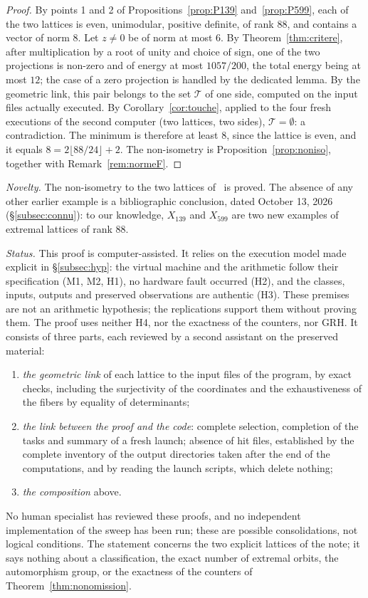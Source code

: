 \documentclass[11pt,a4paper]{amsart}
\theoremstyle{plain}
\theoremstyle{definition}
\numberwithin{equation}{section}
\newcommand{\Tc}{\mathcal{T}}
\begin{document}
\begin{proof}
By points 1 and 2 of Propositions~\ref{prop:P139} and~\ref{prop:P599}, each of the two lattices is even, unimodular, positive definite, of rank $88$, and contains a vector of norm $8$. Let $z\ne0$ be of norm at most $6$. By Theorem~\ref{thm:critere}, after multiplication by a root of unity and choice of sign, one of the two projections is non-zero and of energy at most $1057/200$, the total energy being at most $12$; the case of a zero projection is handled by the dedicated lemma. By the geometric link, this pair belongs to the set $\Tc$ of one side, computed on the input files actually executed. By Corollary~\ref{cor:touche}, applied to the four fresh executions of the second computer (two lattices, two sides), $\Tc=\emptyset$: a contradiction. The minimum is therefore at least $8$, since the lattice is even, and it equals $8=2\lfloor88/24\rfloor+2$. The non-isometry is Proposition~\ref{prop:noniso}, together with Remark~\ref{rem:normeF}.
\end{proof}

\noindent\emph{Novelty.} The non-isometry to the two lattices of~\cite{Sak26} is proved. The absence of any other earlier example is a bibliographic conclusion, dated October 13, 2026 (\S\ref{subsec:connu}): to our knowledge, $X_{139}$ and $X_{599}$ are two new examples of extremal lattices of rank $88$.

\noindent\emph{Status.} This proof is computer-assisted. It relies on the execution model made explicit in \S\ref{subsec:hyp}: the virtual machine and the arithmetic follow their specification (M1, M2, H1), no hardware fault occurred (H2), and the classes, inputs, outputs and preserved observations are authentic (H3). These premises are not an arithmetic hypothesis; the replications support them without proving them. The proof uses neither H4, nor the exactness of the counters, nor GRH. It consists of three parts, each reviewed by a second assistant on the preserved material:
\begin{enumerate}[label=\textup{(\Alph*)}]
\item \emph{the geometric link} of each lattice to the input files of the program, by exact checks, including the surjectivity of the coordinates and the exhaustiveness of the fibers by equality of determinants;
\item \emph{the link between the proof and the code}: complete selection, completion of the tasks and summary of a fresh launch; absence of hit files, established by the complete inventory of the output directories taken after the end of the computations, and by reading the launch scripts, which delete nothing;
\item \emph{the composition} above.
\end{enumerate}
No human specialist has reviewed these proofs, and no independent implementation of the sweep has been run; these are possible consolidations, not logical conditions. The statement concerns the two explicit lattices of the note; it says nothing about a classification, the exact number of extremal orbits, the automorphism group, or the exactness of the counters of Theorem~\ref{thm:nonomission}.
\end{document}
